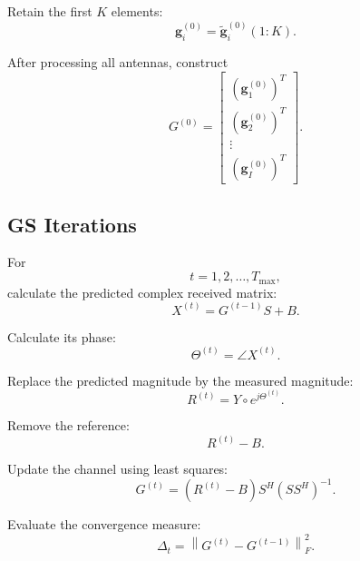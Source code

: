 \documentclass[12pt,a4paper]{article}
\begin{document}
Retain the first $K$ elements:
\begin{equation}
\boxed{
\mathbf g_i^{(0)}
=
\widetilde{\mathbf g}_i^{(0)}(1:K)
}.
\tag{343}
\end{equation}

After processing all antennas, construct
\begin{equation}
\boxed{
G^{(0)}
=
\begin{bmatrix}
(\mathbf g_1^{(0)})^T\\
(\mathbf g_2^{(0)})^T\\
\vdots\\
(\mathbf g_I^{(0)})^T
\end{bmatrix}
}.
\tag{344}
\end{equation}

\subsection{GS Iterations}

For
\begin{equation}
t=1,2,\ldots,T_{\max},
\tag{345}
\end{equation}
calculate the predicted complex received matrix:
\begin{equation}
\boxed{
X^{(t)}
=
G^{(t-1)}S+B
}.
\tag{346}
\end{equation}

Calculate its phase:
\begin{equation}
\boxed{
\Theta^{(t)}
=
\angle X^{(t)}
}.
\tag{347}
\end{equation}

Replace the predicted magnitude by the measured magnitude:
\begin{equation}
\boxed{
R^{(t)}
=
Y\circ e^{j\Theta^{(t)}}
}.
\tag{348}
\end{equation}

Remove the reference:
\begin{equation}
\boxed{
R^{(t)}-B
}.
\tag{349}
\end{equation}

Update the channel using least squares:
\begin{equation}
\boxed{
G^{(t)}
=
(R^{(t)}-B)S^H(SS^H)^{-1}
}.
\tag{350}
\end{equation}

Evaluate the convergence measure:
\begin{equation}
\boxed{
\Delta_t
=
\left\|
G^{(t)}-G^{(t-1)}
\right\|_F^2
}.
\tag{351}
\end{equation}
\end{document}

